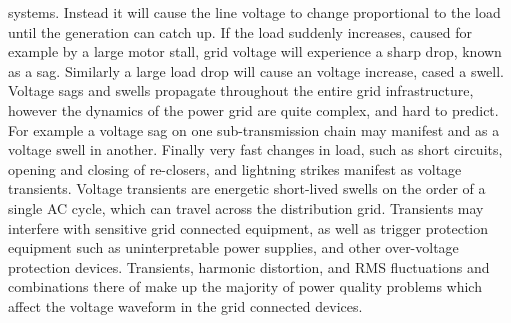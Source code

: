systems. Instead it will cause the line voltage to change proportional to the load until the generation can catch up. If the load suddenly increases, caused for example by a large motor stall, grid voltage will experience a sharp drop, known as a sag. Similarly a large load drop will cause an voltage increase, cased a swell. Voltage sags and swells propagate throughout the entire grid infrastructure, however the dynamics of the power grid are quite complex, and hard to predict. For example a voltage sag on one sub-transmission chain may manifest and as a voltage swell in another. Finally very fast changes in load, such as short circuits, opening and closing of re-closers, and lightning strikes manifest as voltage transients. Voltage transients are energetic short-lived swells on the order of a single AC cycle, which can travel across the distribution grid. Transients may interfere with sensitive grid connected equipment, as well as trigger protection equipment such as uninterpretable power supplies, and other over-voltage protection devices. Transients, harmonic distortion, and RMS fluctuations and combinations there of make up the majority of power quality problems which affect the voltage waveform in the grid connected devices. \cite{5154067}

